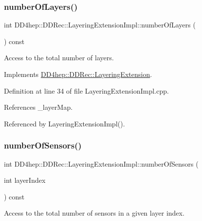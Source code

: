 \subsubsection{\texorpdfstring{number\+Of\+Layers()}{numberOfLayers()}}
{\footnotesize\ttfamily int D\+D4hep\+::\+D\+D\+Rec\+::\+Layering\+Extension\+Impl\+::number\+Of\+Layers (\begin{DoxyParamCaption}{ }\end{DoxyParamCaption}) const\hspace{0.3cm}{\ttfamily [virtual]}}



Access to the total number of layers. 



Implements \hyperlink{class_d_d4hep_1_1_d_d_rec_1_1_layering_extension_a2a0ee0e2bdb875de6573591e2648e446}{D\+D4hep\+::\+D\+D\+Rec\+::\+Layering\+Extension}.



Definition at line 34 of file Layering\+Extension\+Impl.\+cpp.



References \+\_\+layer\+Map.



Referenced by Layering\+Extension\+Impl().

\hypertarget{class_d_d4hep_1_1_d_d_rec_1_1_layering_extension_impl_a6d5c1cd2069a0af86944ea4aa55357a8}{}\label{class_d_d4hep_1_1_d_d_rec_1_1_layering_extension_impl_a6d5c1cd2069a0af86944ea4aa55357a8} 
\subsubsection{\texorpdfstring{number\+Of\+Sensors()}{numberOfSensors()}}
{\footnotesize\ttfamily int D\+D4hep\+::\+D\+D\+Rec\+::\+Layering\+Extension\+Impl\+::number\+Of\+Sensors (\begin{DoxyParamCaption}\item[{int}]{layer\+Index }\end{DoxyParamCaption}) const\hspace{0.3cm}{\ttfamily [virtual]}}



Access to the total number of sensors in a given layer index. 



